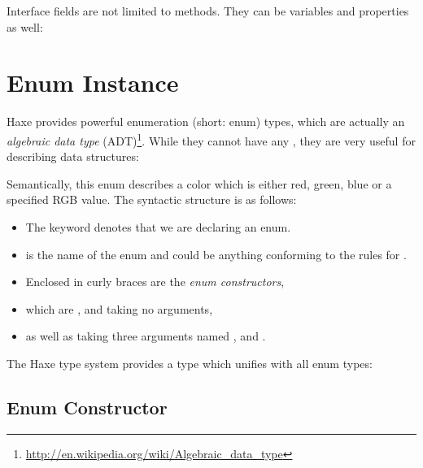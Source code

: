 Interface fields are not limited to methods. They can be variables and properties as well:




\section{Enum Instance}
\label{types-enum-instance}

Haxe provides powerful enumeration (short: enum) types, which are actually an \emph{algebraic data type} (ADT)\footnote{\url{http://en.wikipedia.org/wiki/Algebraic_data_type}}. While they cannot have any , they are very useful for describing data structures:

Semantically, this enum describes a color which is either red, green, blue or a specified RGB value. The syntactic structure is as follows:
\begin{itemize}
	\item The keyword  denotes that we are declaring an enum.
	\item {} is the name of the enum and could be anything conforming to the rules for .
	\item Enclosed in curly braces \expr{$\left\{\right\}$} are the \emph{enum constructors},
	\item which are ,  and  taking no arguments,
	\item as well as  taking three  arguments named ,  and .
\end{itemize}
The Haxe type system provides a type which unifies with all enum types:


\subsection{Enum Constructor}
\label{types-enum-constructor}

